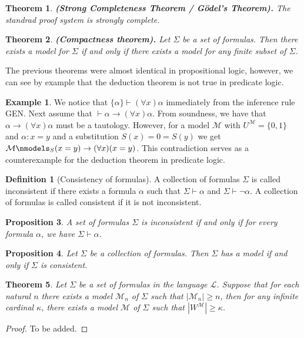 \documentclass[11pt,a4paper]{article}
\theoremstyle{definition}
\newtheorem{definition}{Definition}[section]
\newtheorem{example}{Example}[section]
\theoremstyle{plain}
\newtheorem{theorem}{Theorem}[section]
\newtheorem{proposition}[theorem]{Proposition}
\newcommand{\M}{\mathcal{M}}
\renewcommand{\L}{\mathcal{L}}
\renewcommand{\tt}[1]{\textnormal{\textbf{(#1).}}} %
\renewcommand{\implies}{\rightarrow}
\begin{document}
  \begin{theorem}\tt{Strong Completeness Theorem / Gödel's Theorem}
    The standrad proof system is strongly complete.
  \end{theorem}

  \begin{theorem}\tt{Compactness theorem}
    Let $\Sigma$ be a set of formulas.
    Then there exists a model for $\Sigma$ if and only if
    there exists a model for any finite subset of $\Sigma$.
  \end{theorem}

  The previous theorems were almost identical in propositional logic,
  however, we can see by example that the deduction theorem is not
  true in predicate logic.

  \begin{example}
    We notice that $\{\alpha\} \vdash (\forall x) \alpha$ immediately
    from the inference rule GEN.
    Next assume that $\vdash \alpha \implies (\forall x) \alpha$.
    From soundness, we have that $\alpha \implies (\forall x) \alpha$
    must be a tautology.
    However, for a model $\M$ with $U^\M = \{0,1\}$ and 
    $\alpha \colon x = y$ and a substitution $S(x) = 0 = S(y)$ we get
    $\M \nmodels_S (x = y) \implies (\forall x)(x = y)$.
    This contradiction serves as a counterexample for the deduction theorem
    in predicate logic.
  \end{example}

  \begin{definition}[Consistency of formulas]
    A collection of formulas $\Sigma$ is called inconsistent if there 
    exists a formula $\alpha$ such that $\Sigma \vdash \alpha$ and
    $\Sigma \vdash \neg \alpha$.
    A collection of formulas is called consistent if it is not inconsistent.
  \end{definition}
  
  \begin{proposition}
    A set of formulas $\Sigma$ is inconsistent if and only if for every 
    formula $\alpha$, we have $\Sigma \vdash \alpha$.
  \end{proposition}

  \begin{proposition}
    Let $\Sigma$ be a collection of formulas.
    Then $\Sigma$ has a model if and only if $\Sigma$ is consistent.
  \end{proposition}

  \begin{theorem}\label{thm:finite-infinite}
    Let $\Sigma$ be a set of formulas in the language $\L$.
    Suppose that for each natural $n$ there exists a model $\M_n$ of 
    $\Sigma$ such that $|\M_n| \geq n$, 
    then for any infinite cardinal $\kappa$, there exists a model 
    $\M$ of $\Sigma$ such that $|W^\M| \geq \kappa$.
  \end{theorem}
  \begin{proof}
    To be added.
  \end{proof}
\end{document}
